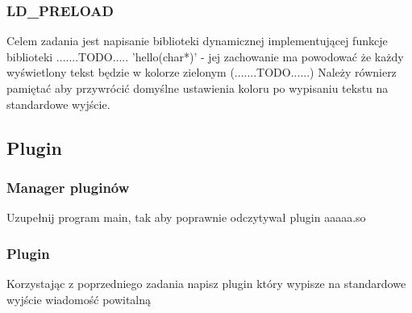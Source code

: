 \documentclass[12pt]{article}
\begin{document}
\subsubsection{LD\_PRELOAD}
Celem zadania jest napisanie biblioteki dynamicznej implementującej funkcje
biblioteki .......TODO..... 'hello(char*)' - jej zachowanie ma powodować że każdy
wyświetlony tekst będzie w kolorze zielonym (.......TODO......) Należy równierz
pamiętać aby przywrócić domyślne ustawienia koloru po wypisaniu tekstu na
standardowe wyjście.

\subsection{Plugin}
\subsubsection{Manager pluginów}
Uzupełnij program main, tak aby poprawnie odczytywał plugin aaaaa.so
\subsubsection{Plugin}
Korzystając z poprzedniego zadania napisz plugin który wypisze na standardowe
wyjście wiadomość powitalną
\end{document}
